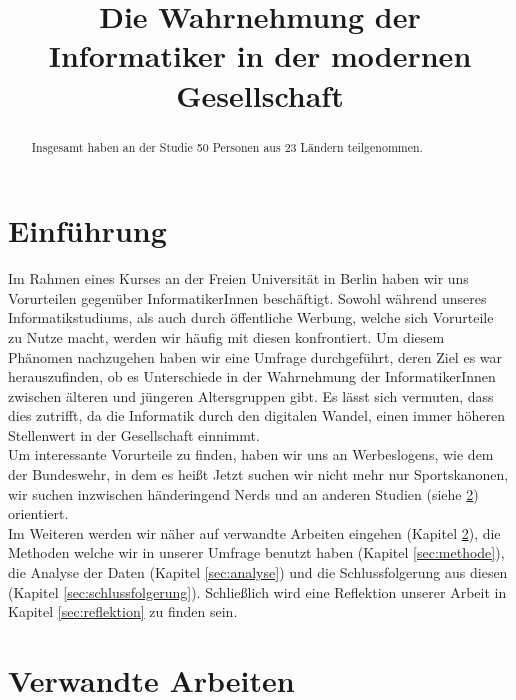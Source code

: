 \documentclass[de]{agse-empir-report}\usepackage[]{graphicx}\usepackage[]{color}
\begin{document}
\title{Die Wahrnehmung der Informatiker in der modernen Gesellschaft}
\author{
    \and
    \and
}

\maketitle



\begin{abstract}
    \lipsum[1]
    Insgesamt haben an der Studie 50 Personen
    aus 23 Ländern teilgenommen.
\end{abstract}


\section[fz]{Einführung}

Im Rahmen eines Kurses an der Freien Universität in Berlin haben wir uns Vorurteilen gegenüber InformatikerInnen beschäftigt. Sowohl während unseres Informatikstudiums, als auch durch öffentliche Werbung, welche sich Vorurteile zu Nutze macht, werden wir häufig mit diesen konfrontiert.
Um diesem Phänomen nachzugehen haben wir eine Umfrage durchgeführt, deren Ziel es war herauszufinden, ob es Unterschiede in der Wahrnehmung der InformatikerInnen zwischen älteren und jüngeren Altersgruppen gibt. Es lässt sich vermuten, dass dies zutrifft, da die Informatik durch den digitalen Wandel, einen immer höheren Stellenwert in der Gesellschaft einnimmt.\\
Um interessante Vorurteile zu finden, haben wir uns an Werbeslogens, wie dem der Bundeswehr, in dem es heißt \glqq Jetzt suchen wir nicht mehr nur Sportskanonen, wir suchen inzwischen händeringend Nerds \grqq \cite{Bundeswehr} und an anderen Studien (siehe \ref{sec:verwandteArbeiten}) orientiert. \\
Im Weiteren werden wir näher auf verwandte Arbeiten eingehen (Kapitel \ref{sec:verwandteArbeiten}), die Methoden welche wir in unserer Umfrage benutzt haben (Kapitel \ref{sec:methode}), die Analyse der Daten (Kapitel \ref{sec:analyse}) und die Schlussfolgerung aus diesen (Kapitel \ref{sec:schlussfolgerung}). Schließlich wird eine Reflektion unserer Arbeit in Kapitel \ref{sec:reflektion} zu finden sein.

\section[kk]{Verwandte Arbeiten}\label{sec:verwandteArbeiten}
\end{document}
